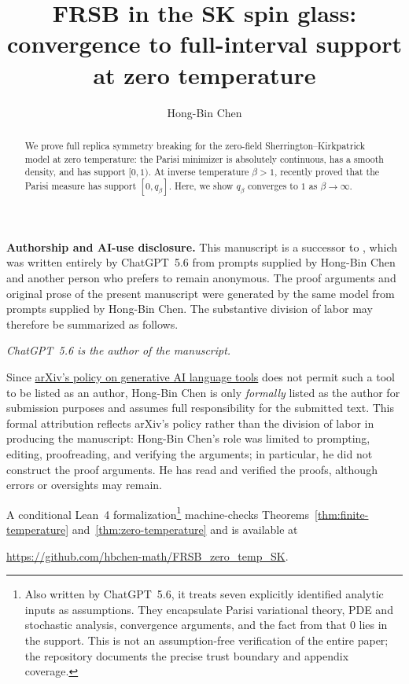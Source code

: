 \documentclass[10pt]{amsart}
\title[FRSB in the SK spin glass]{FRSB in the SK spin glass: convergence to full-interval support at zero temperature}
\author[Hong-Bin Chen]{Hong-Bin Chen\authorcontactmark}
\date{}
\theoremstyle{definition}
\theoremstyle{remark}
\numberwithin{equation}{section}
\newcommand{\1}{\mathbf 1}
\begin{document}
\begin{abstract}
We prove full replica symmetry breaking for the zero-field Sherrington--Kirkpatrick model at zero temperature: the Parisi minimizer is absolutely continuous, has a smooth density, and has support $[0,1)$. At inverse temperature $\beta>1$, \cite{Lopatto2026} recently proved that the Parisi measure has support $[0,q_\beta]$. Here, we show $q_\beta$ converges to $1$ as $\beta\to\infty$.
\end{abstract}

\renewcommand{\thefootnote}{\fnsymbol{footnote}}
\maketitle
{}
\renewcommand{\thefootnote}{\arabic{footnote}}
\setcounter{footnote}{0}

\noindent\textbf{Authorship and AI-use disclosure.} This manuscript is a successor to \cite{AIxivPreprint}, which was written entirely by ChatGPT~5.6 from prompts supplied by Hong-Bin Chen and another person who prefers to remain anonymous. The proof arguments and original prose of the present manuscript were generated by the same model from prompts supplied by Hong-Bin Chen. The substantive division of labor may therefore be summarized as follows.
\begin{center}
\textit{ChatGPT~5.6 is the author of the manuscript.}
\end{center}
Since \href{https://info.arxiv.org/help/moderation/index.html\#policy-for-authors-use-of-generative-ai-language-tools}{arXiv's policy on generative AI language tools} does not permit such a tool to be listed as an author, Hong-Bin Chen is only \textit{formally} listed as the author for submission purposes and assumes full responsibility for the submitted text. This formal attribution reflects arXiv's policy rather than the division of labor in producing the manuscript: Hong-Bin Chen's role was limited to prompting, editing, proofreading, and verifying the arguments; in particular, he did not construct the proof arguments. He has read and verified the proofs, although errors or oversights may remain.

\begingroup
\renewcommand{\thefootnote}{\fnsymbol{footnote}}
\setcounter{footnote}{2}
A conditional Lean~4 formalization\footnote{Also written by ChatGPT~5.6, it treats seven explicitly identified analytic inputs as assumptions. They encapsulate Parisi variational theory, PDE and stochastic analysis, convergence arguments, and the fact from \cite{ChenHandschyLerman} that $0$ lies in the support. This is not an assumption-free verification of the entire paper; the repository documents the precise trust boundary and appendix coverage.} machine-checks Theorems~\ref{thm:finite-temperature} and~\ref{thm:zero-temperature} and is available at
\begin{center}
\url{https://github.com/hbchen-math/FRSB_zero_temp_SK}.
\end{center}
\setcounter{footnote}{0}
\endgroup
\end{document}
